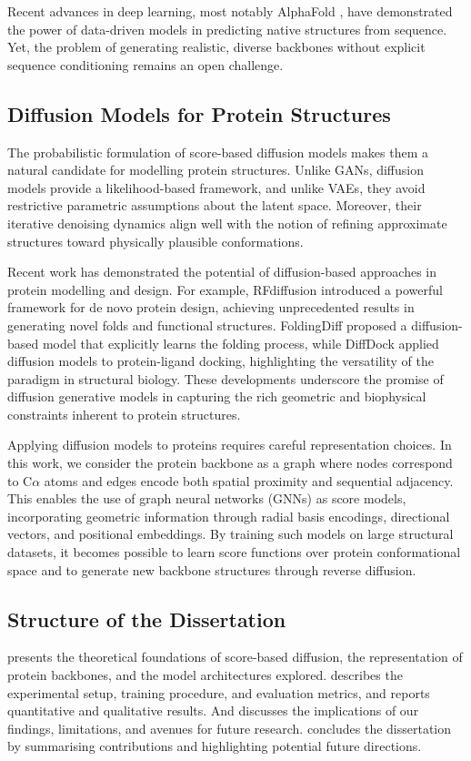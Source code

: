 \documentclass[a4paper,12pt]{article}
\begin{document}
Recent advances in deep learning, most notably AlphaFold \cite{jumper2021HighlyAccurateProtein}, have demonstrated the power of data-driven models in predicting native structures from sequence. Yet, the problem of generating realistic, diverse backbones without explicit sequence conditioning remains an open challenge.

\subsection{Diffusion Models for Protein Structures}
The probabilistic formulation of score-based diffusion models makes them a natural candidate for modelling protein structures. Unlike GANs, diffusion models provide a likelihood-based framework, and unlike VAEs, they avoid restrictive parametric assumptions about the latent space. Moreover, their iterative denoising dynamics align well with the notion of refining approximate structures toward physically plausible conformations.

Recent work has demonstrated the potential of diffusion-based approaches in protein modelling and design. For example, RFdiffusion \cite{watsonNovoDesignProtein2023} introduced a powerful framework for de novo protein design, achieving unprecedented results in generating novel folds and functional structures. FoldingDiff \cite{wuProteinStructureGeneration2024} proposed a diffusion-based model that explicitly learns the folding process, while DiffDock \cite{yimDiffusionModelsProtein2024} applied diffusion models to protein-ligand docking, highlighting the versatility of the paradigm in structural biology. These developments underscore the promise of diffusion generative models in capturing the rich geometric and biophysical constraints inherent to protein structures.

Applying diffusion models to proteins requires careful representation choices. 
In this work, we consider the protein backbone as a graph where nodes correspond to C\(\alpha\) atoms and edges encode both spatial proximity and sequential adjacency. 
This enables the use of graph neural networks (GNNs) \cite{scarselliGraphNeuralNetwork2009} as score models, incorporating geometric information through radial basis encodings, directional vectors, and positional embeddings. 
By training such models on large structural datasets, it becomes possible to learn score functions over protein conformational space and to generate new backbone structures through reverse diffusion.

\subsection{Structure of the Dissertation}
 presents the theoretical foundations of score-based diffusion, the representation of protein backbones, and the model architectures explored.  describes the experimental setup, training procedure, and evaluation metrics, and reports quantitative and qualitative results. And discusses the implications of our findings, limitations, and avenues for future research.  concludes the dissertation by summarising contributions and highlighting potential future directions.
\end{document}
